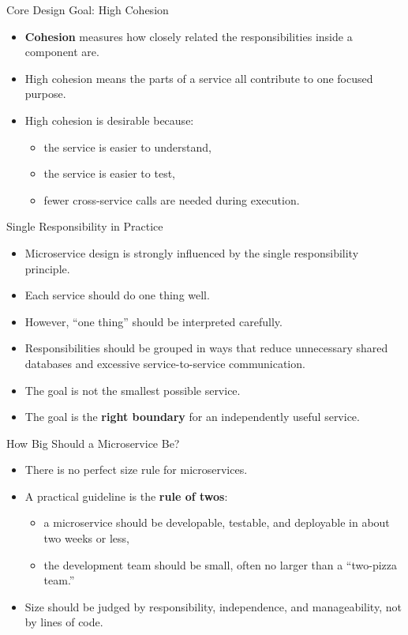 \begin{frame}{Core Design Goal: High Cohesion}
\begin{itemize}
    \item \textbf{Cohesion} measures how closely related the responsibilities inside a component are.
    \item High cohesion means the parts of a service all contribute to one focused purpose.
    \item High cohesion is desirable because:
    \begin{itemize}
        \item the service is easier to understand,
        \item the service is easier to test,
        \item fewer cross-service calls are needed during execution.
    \end{itemize}
\end{itemize}
\end{frame}

\begin{frame}{Single Responsibility in Practice}
\begin{itemize}
    \item Microservice design is strongly influenced by the single responsibility principle.
    \item Each service should do one thing well.
    \item However, ``one thing'' should be interpreted carefully.
    \item Responsibilities should be grouped in ways that reduce unnecessary shared databases and excessive service-to-service communication.
    \item The goal is not the smallest possible service.
    \item The goal is the \textbf{right boundary} for an independently useful service.
\end{itemize}
\end{frame}

\begin{frame}{How Big Should a Microservice Be?}
\begin{itemize}
    \item There is no perfect size rule for microservices.
    \item A practical guideline is the \textbf{rule of twos}:
    \begin{itemize}
        \item a microservice should be developable, testable, and deployable in about two weeks or less,
        \item the development team should be small, often no larger than a ``two-pizza team.''
    \end{itemize}
    \item Size should be judged by responsibility, independence, and manageability, not by lines of code.
\end{itemize}
\end{frame}

